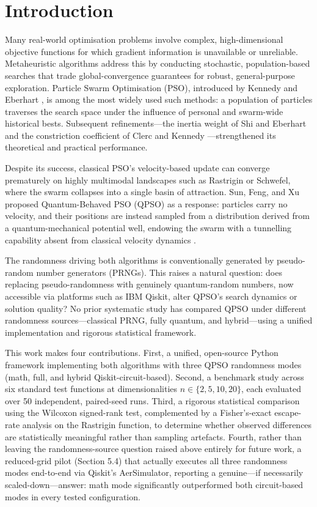 \documentclass[11pt]{article}
\begin{document}
\vspace{-0.5em}
\section{Introduction}
Many real-world optimisation problems involve complex, high-dimensional objective functions for which gradient information is unavailable or unreliable. Metaheuristic algorithms address this by conducting stochastic, population-based searches that trade global-convergence guarantees for robust, general-purpose exploration. Particle Swarm Optimisation (PSO), introduced by Kennedy and Eberhart \cite{kennedy1995}, is among the most widely used such methods: a population of particles traverses the search space under the influence of personal and swarm-wide historical bests. Subsequent refinements---the inertia weight of Shi and Eberhart \cite{shi1998} and the constriction coefficient of Clerc and Kennedy \cite{clerc2002}---strengthened its theoretical and practical performance.

Despite its success, classical PSO's velocity-based update can converge prematurely on highly multimodal landscapes such as Rastrigin or Schwefel, where the swarm collapses into a single basin of attraction. Sun, Feng, and Xu proposed Quantum-Behaved PSO (QPSO) \cite{sun2004} as a response: particles carry no velocity, and their positions are instead sampled from a distribution derived from a quantum-mechanical potential well, endowing the swarm with a tunnelling capability absent from classical velocity dynamics \cite{sun2012}.

The randomness driving both algorithms is conventionally generated by pseudo-random number generators (PRNGs). This raises a natural question: does replacing pseudo-randomness with genuinely quantum-random numbers, now accessible via platforms such as IBM Qiskit, alter QPSO's search dynamics or solution quality? No prior systematic study has compared QPSO under different randomness sources---classical PRNG, fully quantum, and hybrid---using a unified implementation and rigorous statistical framework.

This work makes four contributions. First, a unified, open-source Python framework implementing both algorithms with three QPSO randomness modes (math, full, and hybrid Qiskit-circuit-based). Second, a benchmark study across six standard test functions at dimensionalities $n \in \{2,5,10,20\}$, each evaluated over 50 independent, paired-seed runs. Third, a rigorous statistical comparison using the Wilcoxon signed-rank test, complemented by a Fisher's-exact escape-rate analysis on the Rastrigin function, to determine whether observed differences are statistically meaningful rather than sampling artefacts. Fourth, rather than leaving the randomness-source question raised above entirely for future work, a reduced-grid pilot (Section 5.4) that actually executes all three randomness modes end-to-end via Qiskit's AerSimulator, reporting a genuine---if necessarily scaled-down---answer: math mode significantly outperformed both circuit-based modes in every tested configuration.
\end{document}
